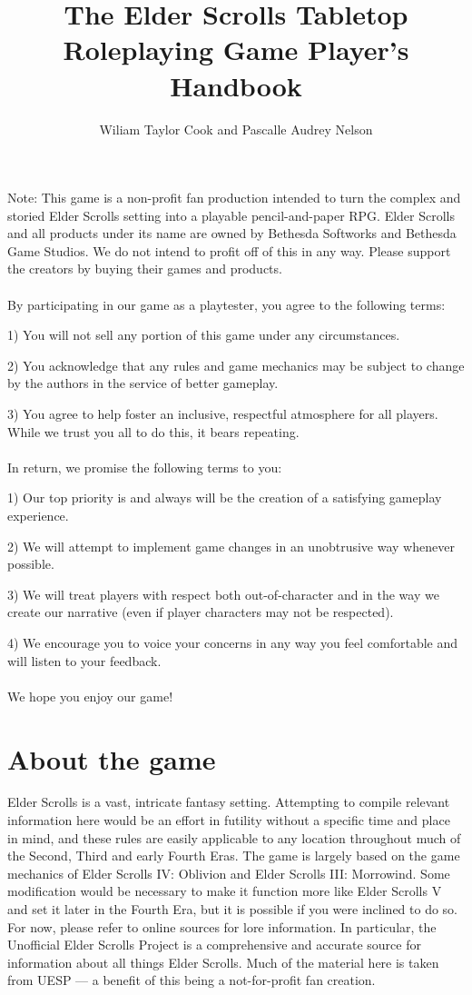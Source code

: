 \documentclass[12pt]{book}
\title{The Elder Scrolls Tabletop Roleplaying Game Player's Handbook}
\author{Wiliam Taylor Cook and Pascalle Audrey Nelson}
\begin{document}
\maketitle

Note: This game is a non-profit fan production intended to turn the complex and storied Elder Scrolls setting into a playable pencil-and-paper RPG. Elder Scrolls and all products under its name are owned by Bethesda Softworks and Bethesda Game Studios. We do not intend to profit off of this in any way. Please support the creators by buying their games and products.\\~\\
By participating in our game as a playtester, you agree to the following terms:

1)	You will not sell any portion of this game under any circumstances.

2)	You acknowledge that any rules and game mechanics may be subject to change by the authors in the service of better gameplay.

3)	You agree to help foster an inclusive, respectful atmosphere for all players. While we trust you all to do this, it bears repeating.\\~\\
In return, we promise the following terms to you:

1)	Our top priority is and always will be the creation of a satisfying gameplay experience.

2)	We will attempt to implement game changes in an unobtrusive way whenever possible.

3)	We will treat players with respect both out-of-character and in the way we create our narrative (even if player characters may not be respected).

4)	We encourage you to voice your concerns in any way you feel comfortable and will listen to your feedback.\\~\\
We hope you enjoy our game!
\newpage

\section*{About the game}

Elder Scrolls is a vast, intricate fantasy setting. Attempting to compile relevant information here would be an effort in futility without a specific time and place in mind, and these rules are easily applicable to any location throughout much of the Second, Third and early Fourth Eras. The game is largely based on the game mechanics of Elder Scrolls IV: Oblivion and Elder Scrolls III: Morrowind. Some modification would be necessary to make it function more like Elder Scrolls V and set it later in the Fourth Era, but it is possible if you were inclined to do so. For now, please refer to online sources for lore information. In particular, the Unofficial Elder Scrolls Project is a comprehensive and accurate source for information about all things Elder Scrolls. Much of the material here is taken from UESP --- a benefit of this being a not-for-profit fan creation.
\end{document}
